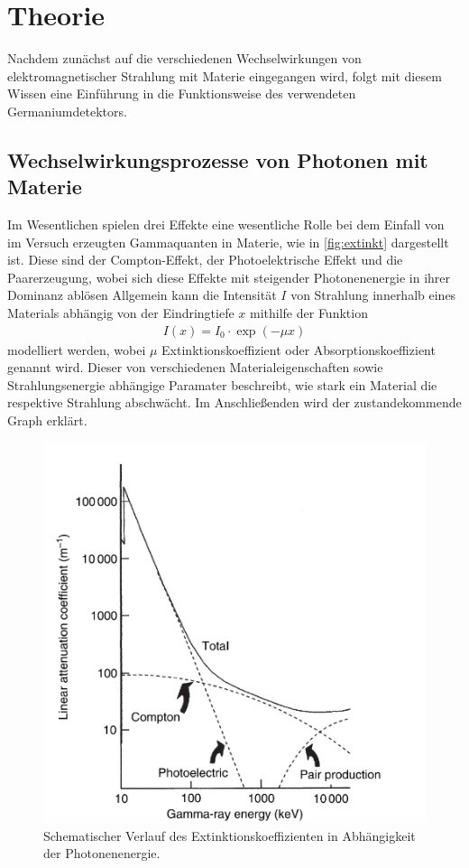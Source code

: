 \section{Theorie}\label{sec:theorie}
Nachdem zunächst auf die verschiedenen Wechselwirkungen von elektromagnetischer Strahlung mit Materie eingegangen wird, folgt mit diesem Wissen eine Einführung in die Funktionsweise des verwendeten Germaniumdetektors.
\subsection{Wechselwirkungsprozesse von Photonen mit Materie}
Im Wesentlichen spielen drei Effekte eine wesentliche Rolle bei dem Einfall von im Versuch erzeugten Gammaquanten in Materie, wie in \autoref{fig:extinkt} dargestellt ist. Diese sind der Compton-Effekt, der Photoelektrische Effekt und die Paarerzeugung, wobei sich diese Effekte mit steigender Photonenenergie in ihrer Dominanz ablösen
Allgemein kann die Intensität $I$ von Strahlung innerhalb eines Materials abhängig von der Eindringtiefe $x$ mithilfe der Funktion
\begin{align}
  I(x) = I_0\cdot\exp{(-\mu x)}
\end{align}
modelliert werden, wobei $\mu$ Extinktionskoeffizient oder Absorptionskoeffizient genannt wird. Dieser von verschiedenen Materialeigenschaften sowie Strahlungsenergie abhängige Paramater beschreibt, wie stark ein Material die respektive Strahlung abschwächt.
Im Anschließenden wird der zustandekommende Graph erklärt.
\begin{figure}[H]
  \centering
  \includegraphics[scale=0.65]{Ressourcen/extinkt.png}
  \caption{Schematischer Verlauf des Extinktionskoeffizienten in Abhängigkeit der Photonenenergie\cite{gilmore}.}
  \label{fig:extinkt}
\end{figure}
